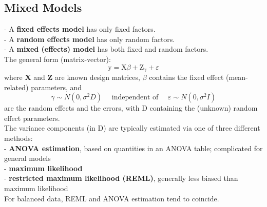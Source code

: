 \documentclass[11pt,a4paper]{article}
\begin{document}
\subsection{ Mixed Models}
- A \textbf{fixed effects model} has only fixed factors.\\
- A \textbf{random effects model} has only random factors.\\
- A \textbf{mixed (effects) model} has both fixed and random factors.\\
The general form (matrix-vector):
$$
\mathrm{y}=\mathrm{X} \beta+\mathrm{Z}_{\gamma}+\varepsilon
$$
where $\mathbf{X}$ and $\mathbf{Z}$ are known design matrices, $\beta$ contains the fixed effect (mean-related) parameters, and
$$
\gamma \sim N\left(0, \sigma^{2} D\right) \quad \text { independent of } \quad \varepsilon \sim N\left(0, \sigma^{2} I\right)
$$
are the random effects and the errors, with D containing the (unknown) random effect parameters.\\

The variance components (in D) are typically estimated via one of three different methods:\\
- \textbf{ANOVA estimation}, based on quantities in an ANOVA table; complicated for general models\\
- \textbf{maximum likelihood}\\
- \textbf{restricted maximum likelihood (REML)}, generally less biased than maximum likelihood\\
For balanced data, REML and ANOVA estimation tend to coincide.
\end{document}
